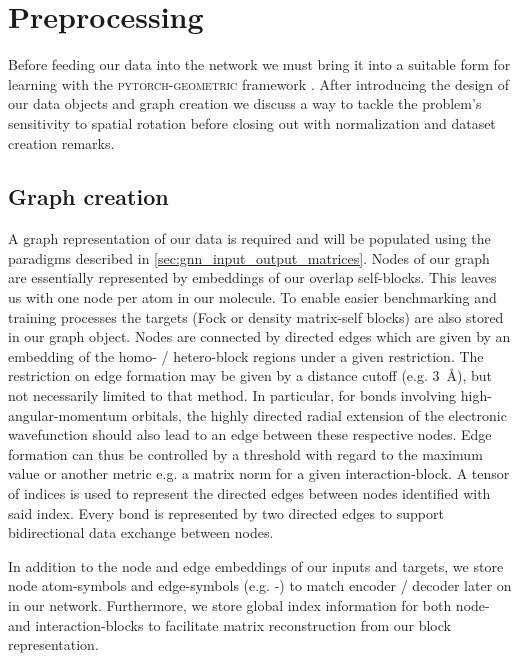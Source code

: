 \section{Preprocessing}
\label{sec:gnn_preproc}
Before feeding our data into the network we must bring it into a suitable form for learning with the \textsc{pytorch-geometric} framework \parencite{ref:PyTorchGeometric, ref:PyTorch_geom_paper}. After introducing the design of our data objects and graph creation we discuss a way to tackle the problem's sensitivity to spatial rotation before closing out with normalization and dataset creation remarks. 
\subsection{Graph creation}
\label{subsec:gnn_graph_creation}
A graph representation of our data is required and will be populated using the paradigms described in \autoref{sec:gnn_input_output_matrices}. Nodes of our graph are essentially represented by embeddings of our overlap self-blocks. This leaves us with one node per atom in our molecule. To enable easier benchmarking and training processes the targets (Fock or density matrix-self blocks) are also stored in our graph object. Nodes are connected by directed edges which are given by an embedding of the homo- / hetero-block regions under a given restriction. The restriction on edge formation may be given by a distance cutoff (e.g. \SI{3}{\angstrom}), but not necessarily limited to that method. In particular, for bonds involving high-angular-momentum orbitals, the highly directed radial extension of the electronic wavefunction should also lead to an edge between these respective nodes. Edge formation can thus be controlled by a threshold with regard to the maximum value or another metric e.g. a matrix norm for a given interaction-block. A tensor of indices is used to represent the directed edges between nodes identified with said index. Every bond is represented by two directed edges to support bidirectional data exchange between nodes.

In addition to the node and edge embeddings of our inputs and targets, we store node atom-symbols and edge-symbols (e.g. -) to match encoder / decoder later on in our network. Furthermore, we store global index information for both node- and interaction-blocks to facilitate matrix reconstruction from our block representation. 


